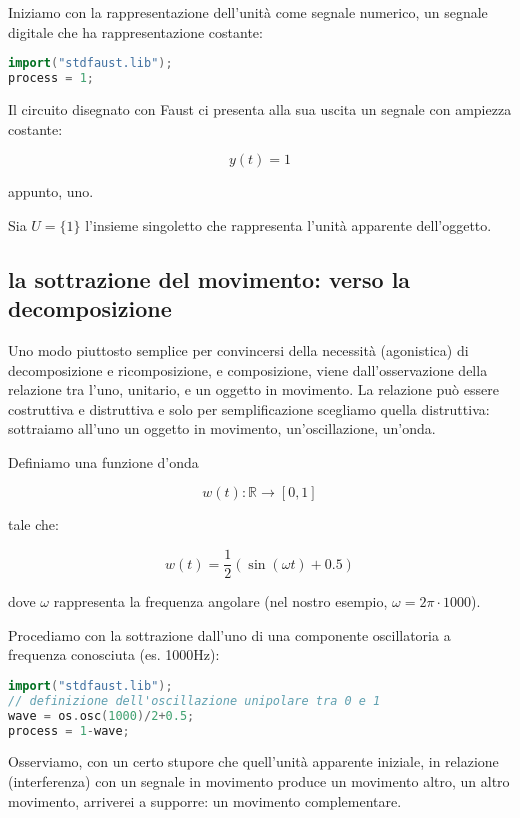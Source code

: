 \documentclass[a4paper,11pt]{article}
\begin{document}
Iniziamo con la rappresentazione dell'unità come segnale numerico, un
segnale digitale che ha rappresentazione costante:

\begin{lstlisting}[language={C++}]
import("stdfaust.lib");
process = 1;
\end{lstlisting}

Il circuito disegnato con Faust ci presenta alla sua uscita un segnale
con ampiezza costante:

\[y(t)=1\]

appunto, uno.

Sia \(U = \{1\}\) l'insieme singoletto che rappresenta l'unità apparente
dell'oggetto.

\subsection{la sottrazione del movimento: verso la
decomposizione}\label{la-sottrazione-del-movimento-verso-la-decomposizione}

Uno modo piuttosto semplice per convincersi della necessità (agonistica)
di decomposizione e ricomposizione, e composizione, viene
dall'osservazione della relazione tra l'uno, unitario, e un oggetto in
movimento. La relazione può essere costruttiva e distruttiva e solo per
semplificazione scegliamo quella distruttiva: sottraiamo all'uno un
oggetto in movimento, un'oscillazione, un'onda.

Definiamo una funzione d'onda

\[w(t): \mathbb{R} \to [0,1]\]

tale che:

\[w(t) = \frac{1}{2}(\sin(\omega t) + 0.5)\]

dove \(\omega\) rappresenta la frequenza angolare (nel nostro esempio,
\(\omega = 2\pi \cdot 1000\)).

Procediamo con la sottrazione dall'uno di una componente oscillatoria a
frequenza conosciuta (es. 1000Hz):

\begin{lstlisting}[language={C++}]
import("stdfaust.lib");
// definizione dell'oscillazione unipolare tra 0 e 1
wave = os.osc(1000)/2+0.5;
process = 1-wave;
\end{lstlisting}

Osserviamo, con un certo stupore che quell'unità apparente iniziale, in
relazione (interferenza) con un segnale in movimento produce un
movimento altro, un altro movimento, arriverei a supporre: un movimento
complementare.
\end{document}
